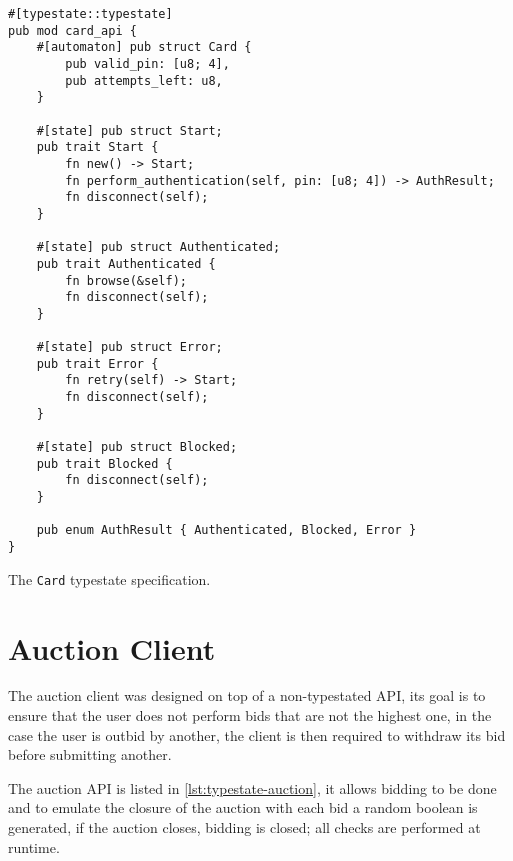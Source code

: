 \begin{listing}
    \begin{verbatim}
#[typestate::typestate]
pub mod card_api {
    #[automaton] pub struct Card {
        pub valid_pin: [u8; 4],
        pub attempts_left: u8,
    }

    #[state] pub struct Start;
    pub trait Start {
        fn new() -> Start;
        fn perform_authentication(self, pin: [u8; 4]) -> AuthResult;
        fn disconnect(self);
    }

    #[state] pub struct Authenticated;
    pub trait Authenticated {
        fn browse(&self);
        fn disconnect(self);
    }

    #[state] pub struct Error;
    pub trait Error {
        fn retry(self) -> Start;
        fn disconnect(self);
    }

    #[state] pub struct Blocked;
    pub trait Blocked {
        fn disconnect(self);
    }

    pub enum AuthResult { Authenticated, Blocked, Error }
}
    \end{verbatim}
    \caption{The \texttt{Card} typestate specification.}
    \label{lst:typestate-card}
\end{listing}


\section{Auction Client}

The auction client was designed on top of a non-typestated API,
its goal is to ensure that the user does not perform bids that are not the highest one,
in the case the user is outbid by another, the client is then required to withdraw its bid before submitting another.

The auction API is listed in \autoref{lst:typestate-auction},
it allows bidding to be done and to emulate the closure of the auction with each bid a random boolean is generated,
if the auction closes, bidding is closed; all checks are performed at runtime.

